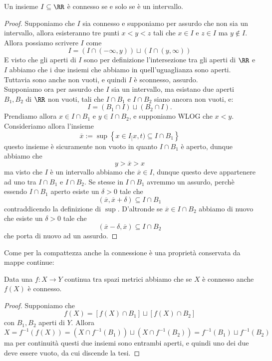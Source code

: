 \documentclass[11pt]{scrartcl}
\begin{document}
	\begin{proposition}
		Un insieme $I\subseteq \RR$ è connesso se e solo se è un intervallo.
	\end{proposition}
	\begin{proof}
		Supponiamo che $I$ sia connesso e supponiamo per assurdo che non sia un intervallo, allora esisteranno tre punti $x<y<z$ tali che $x\in I$ e $z\in I$ ma $y\not\in I$. Allora possiamo scrivere $I$ come
		$$I=\left(I\cap \left(-\infty,y\right)\right)\sqcup \left(I\cap \left(y,\infty\right)\right)$$
		E visto che gli aperti di $I$ sono per definizione l'intersezione tra gli aperti di $\RR$ e $I$ abbiamo che i due insiemi che abbiamo in quell'uguaglianza sono aperti. Tuttavia sono anche non vuoti, e quindi $I$ è sconnesso, assurdo. \\
		Supponiamo ora per assurdo che $I$ sia un intervallo, ma esistano due aperti $B_1,B_2$ di $\RR$ non vuoti, tali che $I\cap B_1$ e $I\cap B_2$ siano ancora non vuoti, e:
		$$I=\left(B_1\cap I\right)\sqcup\left(B_2\cap I\right).$$
		Prendiamo allora $x\in I\cap B_1$ e $y\in I\cap B_2$, e supponiamo WLOG che $x<y$. Consideriamo allora l'insieme
		$$\overline{x}:=\sup\left\{x\in I_[x,t)\subseteq I\cap B_1\right\}$$
		questo insieme è sicuramente non vuoto in quanto $I\cap B_1$ è aperto, dunque abbiamo che
		$$y>\overline{x}>x$$
		ma visto che $I$ è un intervallo abbiamo che $\overline{x}\in I$, dunque questo deve appartenere ad uno tra $I\cap B_1$ e $I\cap B_2$. Se stesse in $I\cap B_1$ avremmo un assurdo, perchè essendo $I\cap B_1$ aperto esiste un $\delta>0$ tale che
		$$(\overline{x},\overline{x}+\delta)\subseteq I\cap B_1$$
		contraddicendo la definizione di $\sup$. D'altronde se $\overline{x}\in I\cap B_2 $ abbiamo di nuovo che esiste un $\delta>0$ tale che
		$$\left(\overline{x}-\delta,\overline{x}\right)\subseteq I\cap B_2$$
		che porta di nuovo ad un assurdo.
	\end{proof}
	Come per la compattezza anche la connessione è una proprietà conservata da mappe continue:
	\begin{theorem}
		Data una $f:X\to Y$ continua tra spazi metrici abbiamo che se $X$ è connesso anche $f(X)$ è connesso.
	\end{theorem}
	\begin{proof}
		Supponiamo che 
		$$f(X)=\left[f(X)\cap B_1\right]\sqcup \left[f(X)\cap B_2\right]$$
		con $B_1,B_2$ aperti di $Y$. Allora
		$$X=f^{-1}(f(X))=\left( X\cap f^{-1}(B_1)\right)\sqcup \left(X\cap f^{-1}(B_2)\right)=f^{-1}(B_1)\sqcup f^{-1}(B_2)$$
		ma per continuità questi due insiemi sono entrambi aperti, e quindi uno dei due deve essere vuoto, da cui discende la tesi.
	\end{proof}
\end{document}

